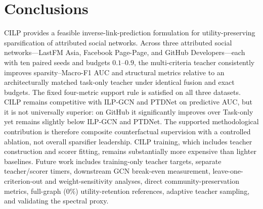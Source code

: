 \section{Conclusions}
\label{sec:conclusions}

CILP provides a feasible inverse-link-prediction formulation for utility-preserving sparsification of attributed social networks.
Across three attributed social networks---LastFM Asia, Facebook Page-Page, and GitHub Developers---each with ten paired seeds and budgets $0.1$--$0.9$, the multi-criteria teacher consistently improves sparsity--Macro-F1 AUC and structural metrics relative to an architecturally matched task-only teacher under identical fusion and exact budgets.
The fixed four-metric support rule is satisfied on all three datasets.
CILP remains competitive with ILP-GCN and PTDNet on predictive AUC, but it is not universally superior: on GitHub it significantly improves over Task-only yet remains slightly below ILP-GCN and PTDNet.
The supported methodological contribution is therefore composite counterfactual supervision with a controlled ablation, not overall sparsifier leadership.
CILP training, which includes teacher construction and scorer fitting, remains substantially more expensive than lighter baselines.
Future work includes training-only teacher targets, separate teacher/scorer timers, downstream GCN break-even measurement, leave-one-criterion-out and weight-sensitivity analyses, direct community-preservation metrics, full-graph ($0\%$) utility-retention references, adaptive teacher sampling, and validating the spectral proxy.
